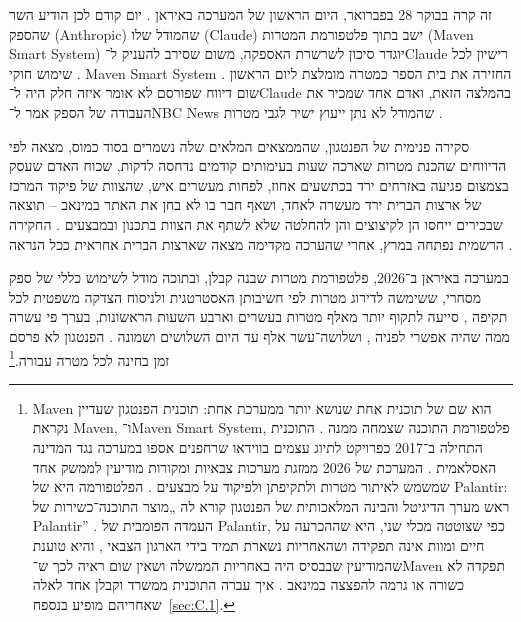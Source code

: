 זה קרה בבוקר 28 בפברואר, היום הראשון של המערכה באיראן \autocite{Amnesty2026Minab,crs2026iranwar}. יום קודם לכן הודיע השר שהספק (Anthropic) שהמודל שלו (Claude) ישב בתוך פלטפורמת המטרות (Maven Smart System) יוגדר סיכון לשרשרת האספקה, משום שסירב להעניק ל־Claude רישיון לכל שימוש חוקי \autocite{npr2026openai}. Maven Smart System החזירה את בית הספר כמטרה מומלצת ליום הראשון \autocite{livingstone2026maven,gizmodo2026minab}. שום דיווח שפורסם לא אומר איזה חלק היה ל־Claude בהמלצה הזאת, ואדם אחד שמכיר את העבודה של הספק אמר ל־NBC News שהמודל לא נתן ייעוץ ישיר לגבי מטרות \autocite{nbc2026targeting}.

סקירה פנימית של הפנטגון, שהממצאים המלאים שלה נשמרים בסוד כמוס, מצאה לפי הדיווחים שהכנת מטרות שארכה שעות בעימותים קודמים נדחסה לדקות, שכוח האדם שעסק בצמצום פגיעה באזרחים ירד בכתשעים אחוז, לפחות מעשרים איש, שהצוות של פיקוד המרכז של ארצות הברית ירד מעשרה לאחד, ושאף חבר בו לא בחן את האתר במינאב – תוצאה שבכירים ייחסו הן לקיצוצים והן להחלטה שלא לשתף את הצוות בתכנון ובמבצעים \autocite{Bloomberg2026KillChain}. החקירה הרשמית נפתחה במרץ, אחרי שהערכה מקדימה מצאה שארצות הברית אחראית ככל הנראה \autocite{NPR2026MinabProbe}.

במערכה באיראן ב־2026, פלטפורמת מטרות שבנה קבלן, ובתוכה מודל לשימוש כללי של ספק מסחרי, ששימשה לדירוג מטרות לפי חשיבותן האסטרטגית ולניסוח הצדקה משפטית לכל תקיפה \autocite{livingstone2026maven}, סייעה לתקוף יותר מאלף מטרות בעשרים וארבע השעות הראשונות, בערך פי עשרה ממה שהיה אפשרי לפניה \autocite{csis2026maven}, ושלושה־עשר אלף עד היום השלושים ושמונה \autocite{breakingdefense2026maven}. הפנטגון לא פרסם זמן בחינה לכל מטרה עבורה.\footnote{Maven הוא שם של תוכנית אחת שנושא יותר ממערכת אחת: תוכנית הפנטגון שעדיין נקראת Maven, ו־Maven Smart System, פלטפורמת התוכנה שצמחה ממנה \autocite{csis2026maven}. התוכנית התחילה ב־2017 כפרויקט לתיוג עצמים בווידאו שרחפנים אספו במערכה נגד המדינה האסלאמית \autocite{weisgerber2017maven,fang2019maven}. המערכת של 2026 ממזגת מערכות צבאיות ומקורות מודיעין לממשק אחד שמשמש לאיתור מטרות ולתקיפתן ולפיקוד על מבצעים \autocite{defensescoop2026transition}. הפלטפורמה היא של Palantir: ראש מערך הדיגיטל והבינה המלאכותית של הפנטגון קורא לה „מוצר התוכנה־כשירות של Palantir” \autocite{defensescoop2026transition}. העמדה הפומבית של Palantir, כפי שצוטטה מכלי שני, היא שההכרעה על חיים ומוות אינה תפקידה ושהאחריות נשארת תמיד בידי הארגון הצבאי \autocite{lee2026palantir}, והיא טוענת שהמודיעין שבבסיס היה באחריות הממשלה ושאין שום ראיה לכך ש־Maven תפקדה לא כשורה או גרמה להפצצה במינאב \autocite{Bloomberg2026KillChain}. איך עברה התוכנית ממשרד וקבלן אחד לאלה שאחריהם מופיע בנספח~\ref{sec:C.1}.}

